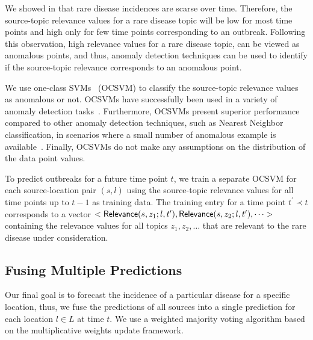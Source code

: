 \documentclass[conference]{IEEEtran}
\begin{document}
We showed in  that rare disease incidences are scarse over time. Therefore, the source-topic relevance values for a rare disease topic will be low for most time points and high only for few time points corresponding to an outbreak. Following this observation, high relevance values for a rare disease topic, can be viewed as anomalous points, and thus, anomaly detection techniques can be used to identify if the source-topic relevance corresponds to an anomalous point.

We use one-class SVMs~\cite{schoelkopf:99} (OCSVM) to classify the source-topic relevance values as anomalous or not. OCSVMs have successfully been used in a variety of anomaly detection tasks~\cite{manevitz:2002,steinwart:05, heller:03}. Furthermore, OCSVMs present superior performance compared to other anomaly detection techniques, such as Nearest Neighbor classification, in scenarios where a small number of anomalous example is available~\cite{khan:13}. Finally, OCSVMs do not make any assumptions on the distribution of the data point values.


To predict outbreaks for a future time point $t$, we train a separate OCSVM for each source-location pair $(s, l)$ using the source-topic relevance values for all time points up to $t-1$ as training data.  The training entry for a time point $t^{\prime} \prec t$ corresponds to a vector $<{\sf Relevance}(s,z_1;l,t^{\prime}), {\sf Relevance}(s,z_2;l,t^{\prime}), \dots>$ containing the relevance values for all topics $z_1, z_2, \dots$ that are relevant to the rare disease under consideration. 

\subsection{Fusing Multiple Predictions}
\label{sec:integration}
Our final goal is to forecast the incidence of a particular disease for a specific location, thus, we fuse the predictions of all sources into a single prediction for each location $l \in L$ at time $t$. We use a weighted majority voting algorithm based on the multiplicative weights update framework\cite{arora:2012}.
\end{document}
